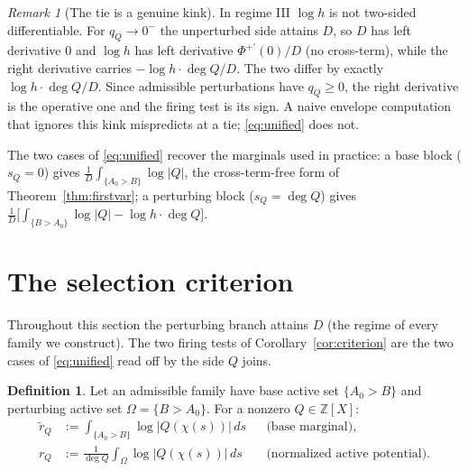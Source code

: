 \documentclass[11pt,reqno]{amsart}
\theoremstyle{plain}
\theoremstyle{definition}
\newtheorem{definition}[theorem]{Definition}
\theoremstyle{remark}
\newtheorem{remark}[theorem]{Remark}
\newcommand{\Z}{\mathbb{Z}}
\newcommand{\rQ}{r_Q}
\begin{document}
\begin{remark}[The tie is a genuine kink]\label{rem:kink}
In regime III $\log h$ is not two-sided differentiable. For $q_Q\to0^-$ the
unperturbed side attains $D$, so $D$ has left derivative $0$ and $\log h$ has left
derivative $\Phi^{+\prime}(0)/D$ (no cross-term), while the right derivative carries
$-\log h\cdot\deg Q/D$. The two differ by exactly $\log h\cdot\deg Q/D$. Since
admissible perturbations have $q_Q\ge0$, the right derivative is the operative one and
the firing test is its sign. A naive envelope computation that ignores this kink
mispredicts at a tie; \eqref{eq:unified} does not.
\end{remark}

The two cases of \eqref{eq:unified} recover the marginals used in practice: a base
block ($s_Q=0$) gives $\frac1D\int_{\{A_0>B\}}\log|Q|$, the cross-term-free form of
Theorem~\ref{thm:firstvar}; a perturbing block ($s_Q=\deg Q$) gives
$\frac1D\bigl[\int_{\{B>A_0\}}\log|Q|-\log h\cdot\deg Q\bigr]$.

\section{The selection criterion}\label{sec:criterion}

Throughout this section the perturbing branch attains $D$ (the regime of every family
we construct). The two firing tests of Corollary~\ref{cor:criterion} are the two
cases of \eqref{eq:unified} read off by the side $Q$ joins.

\begin{definition}\label{def:rq}
Let an admissible family have base active set $\{A_0>B\}$ and perturbing active set
$\Omega=\{B>A_0\}$. For a nonzero $Q\in\Z[X]$:
\begin{align*}
  \widetilde r_Q&:=\int_{\{A_0>B\}}\log|Q(\chi(s))|\,ds
  &&\text{(base marginal)},\\
  \rQ&:=\frac1{\deg Q}\int_\Omega\log|Q(\chi(s))|\,ds
  &&\text{(normalized active potential)}.
\end{align*}
\end{definition}
\end{document}
